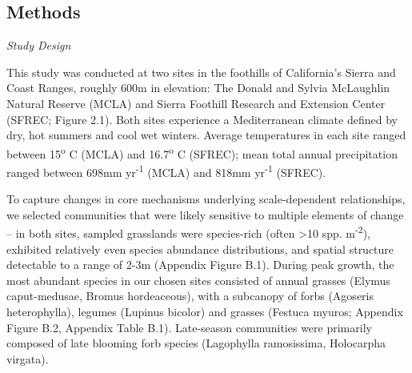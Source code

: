 \documentclass[twoside,12pt,final]{ucthesis-CA2012}
\begin{document}
\begin{ucmainmatter}
\hypertarget{methods}{%
\section{Methods}\label{methods}}

\emph{Study Design}

This study was conducted at two sites in the foothills of California's Sierra and Coast Ranges, roughly 600m in elevation: The Donald and Sylvia McLaughlin Natural Reserve (MCLA) and Sierra Foothill Research and Extension Center (SFREC; Figure 2.1). Both sites experience a Mediterranean climate defined by dry, hot summers and cool wet winters. Average temperatures in each site ranged between 15\textsuperscript{o} C (MCLA) and 16.7\textsuperscript{o} C (SFREC); mean total annual precipitation ranged between 698mm yr\textsuperscript{-1} (MCLA) and 818mm yr\textsuperscript{-1} (SFREC).

To capture changes in core mechanisms underlying scale-dependent relationships, we selected communities that were likely sensitive to multiple elements of change -- in both sites, sampled grasslands were species-rich (often \textgreater10 spp. m\textsuperscript{-2}), exhibited relatively even species abundance distributions, and spatial structure detectable to a range of 2-3m (Appendix Figure B.1). During peak growth, the most abundant species in our chosen sites consisted of annual grasses (Elymus caput-medusae, Bromus hordeaceous), with a subcanopy of forbs (Agoseris heterophylla), legumes (Lupinus bicolor) and grasses (Festuca myuros; Appendix Figure B.2, Appendix Table B.1). Late-season communities were primarily composed of late blooming forb species (Lagophylla ramosissima, Holocarpha virgata).


\end{ucmainmatter}
\end{document}
